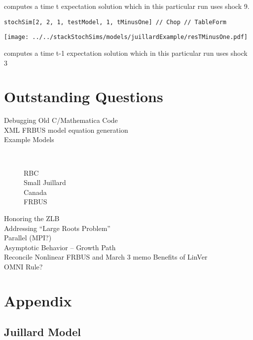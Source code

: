 \documentclass[12pt]{article}
\begin{document}
computes a time t expectation solution which in this particular run uses
shock 9.

\begin{verbatim}
stochSim[2, 2, 1, testModel, 1, tMinusOne] // Chop // TableForm
\end{verbatim}

\texttt{[image: ../../stackStochSims/models/juillardExample/resTMinusOne.pdf]}

computes a time t-1 expectation solution which in this particular run uses
shock 3


\newpage
\section{Outstanding Questions}
\begin{description}
\item[Debugging Old C/Mathematica Code] 
\item[XML FRBUS model equation generation] 
\item[Example Models] \ 
  \begin{description}
  \item[RBC] 
  \item[Small Juillard] 
  \item[Canada] 
  \item[FRBUS] 
  \end{description}
\item[Honoring the ZLB] 
\item[Addressing ``Large Roots Problem''] 
\item[Parallel  (MPI?)] 
\item[Asymptotic Behavior -- Growth Path] 
\item[Reconcile Nonlinear FRBUS and March 3 memo Benefits of LinVer] 
\item[OMNI Rule?] 
\end{description}




\newpage
\appendix

\section{Appendix}
\label{sec:app}

\subsection{Juillard Model}
\label{sec:juillard-model-}
\end{document}
